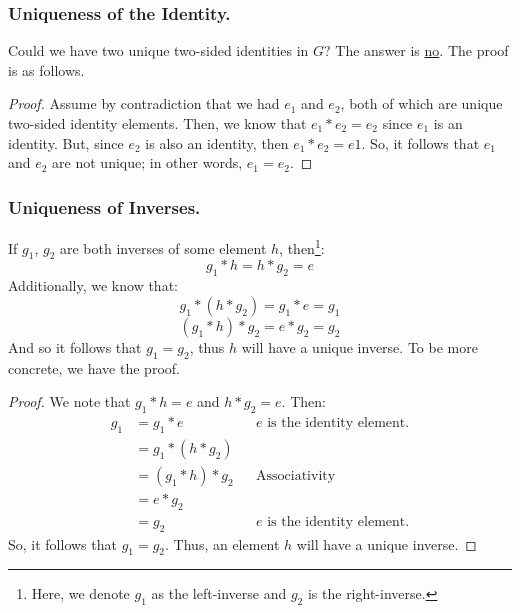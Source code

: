 \documentclass[letterpaper]{article}
\begin{document}
\subsubsection{Uniqueness of the Identity.} 
Could we have two unique two-sided identities in $G$? The answer is \underline{no}. The proof is as follows. 

\begin{mdframed}
    \begin{proof}
        Assume by contradiction that we had $e_1$ and $e_2$, both of which are unique two-sided identity elements. Then, we know that $e_1 * e_2 = e_2$ since $e_1$ is an identity. But, since $e_2$ is also an identity, then $e_1 * e_2 = e1$. So, it follows that $e_1$ and $e_2$ are not unique; in other words, $e_1 = e_2$. 
    \end{proof}
\end{mdframed}

\subsubsection{Uniqueness of Inverses.}

If $g_1$, $g_2$ are both inverses of some element $h$, then\footnote{Here, we denote $g_1$ as the left-inverse and $g_2$ is the right-inverse.}:
\[g_1 * h = h * g_2 = e\]
Additionally, we know that:
\[g_1 * (h * g_2) = g_1 * e = g_1\]
\[(g_1 * h) * g_2 = e * g_2 = g_2\]
And so it follows that $g_1 = g_2$, thus $h$ will have a unique inverse. To be more concrete, we have the proof. 
\begin{mdframed}
    \begin{proof}
        We note that $g_1 * h = e$ and $h * g_2 = e$. Then:
        \begin{equation*}
            \begin{aligned}
                g_1 &= g_1 * e && e \text{ is the identity element.} \\ 
                    &= g_1 * (h * g_2) \\ 
                    &= (g_1 * h) * g_2 && \text{Associativity} \\ 
                    &= e * g_2 \\ 
                    &= g_2 && e \text{ is the identity element.}
            \end{aligned}
        \end{equation*}
        So, it follows that $g_1 = g_2$. Thus, an element $h$ will have a unique inverse. 
    \end{proof}
\end{mdframed}
\end{document}
